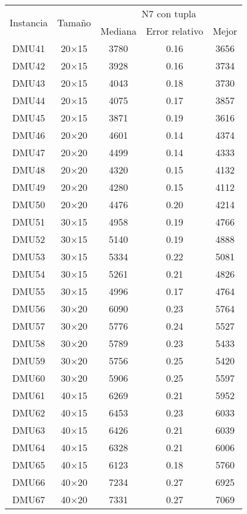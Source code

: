 \begin{table}[H]
\centering
\begin{tabular}{@{}ccccc@{}}
\toprule
\multirow{2}{*}{Instancia} & \multirow{2}{*}{Tamaño} & \multicolumn{3}{c}{N7 con tupla} \\ \cmidrule(lr){3-5}
& & Mediana& Error relativo & Mejor  \\ \midrule
DMU41 & 20$\times$15 & 3780 & 0.16 & 3656\\ 
DMU42 & 20$\times$15 & 3928 & 0.16 & 3734\\ 
DMU43 & 20$\times$15 & 4043 & 0.18 & 3730\\ 
DMU44 & 20$\times$15 & 4075 & 0.17 & 3857\\ 
DMU45 & 20$\times$15 & 3871 & 0.19 & 3616\\ 
DMU46 & 20$\times$20 & 4601 & 0.14 & 4374\\ 
DMU47 & 20$\times$20 & 4499 & 0.14 & 4333\\ 
DMU48 & 20$\times$20 & 4320 & 0.15 & 4132\\ 
DMU49 & 20$\times$20 & 4280 & 0.15 & 4112\\ 
DMU50 & 20$\times$20 & 4476 & 0.20 & 4214\\ 
DMU51 & 30$\times$15 & 4958 & 0.19 & 4766\\ 
DMU52 & 30$\times$15 & 5140 & 0.19 & 4888\\ 
DMU53 & 30$\times$15 & 5334 & 0.22 & 5081\\ 
DMU54 & 30$\times$15 & 5261 & 0.21 & 4826\\ 
DMU55 & 30$\times$15 & 4996 & 0.17 & 4764\\ 
DMU56 & 30$\times$20 & 6090 & 0.23 & 5764\\ 
DMU57 & 30$\times$20 & 5776 & 0.24 & 5527\\ 
DMU58 & 30$\times$20 & 5789 & 0.23 & 5433\\ 
DMU59 & 30$\times$20 & 5756 & 0.25 & 5420\\ 
DMU60 & 30$\times$20 & 5906 & 0.25 & 5597\\ 
DMU61 & 40$\times$15 & 6269 & 0.21 & 5952\\ 
DMU62 & 40$\times$15 & 6453 & 0.23 & 6033\\ 
DMU63 & 40$\times$15 & 6426 & 0.21 & 6039\\ 
DMU64 & 40$\times$15 & 6328 & 0.21 & 6006\\ 
DMU65 & 40$\times$15 & 6123 & 0.18 & 5760\\ 
DMU66 & 40$\times$20 & 7234 & 0.27 & 6925\\ 
DMU67 & 40$\times$20 & 7331 & 0.27 & 7069\\ 

\end{tabular}
\end{table}
